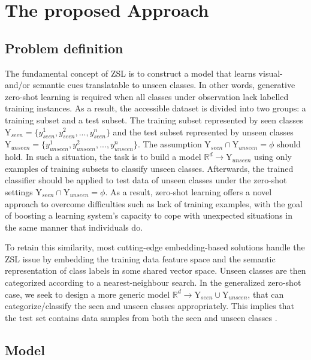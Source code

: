 \documentclass{article}
\begin{document}
\section{The proposed Approach}
\subsection{Problem definition}
The fundamental concept of ZSL is to construct a model that learns visual- and/or semantic cues translatable to unseen classes. In other words, generative zero-shot learning is required when all classes under observation lack labelled  training instances. As a result, the accessible dataset is divided into two groups: a training subset and a test subset. The training subset represented by seen classes $ \mathrm{Y}_{seen}=\{y^{1}_{seen}, y^{2}_{seen}, ..., y^{n}_{seen}\}$ and the test subset represented by unseen classes $ \mathrm{Y}_{unseen} =\{y^{1}_{unseen} , y^{2}_{unseen} , ..., y^{n}_{unseen} \}$. The assumption $ \mathrm{Y}_{seen} \cap  \mathrm{Y}_{unseen} = \phi$  should hold. In such a situation, the task is to build a model $\mathbb{R}^{d}  \rightarrow   \mathrm{Y}_{unseen}$ using only examples of training subsets to classify unseen classes. Afterwards, the trained classifier should be applied to test data of unseen classes under the zero-shot settings $\mathrm{Y}_{seen} \cap  \mathrm{Y}_{unseen} = \phi$. As a result, zero-shot learning offers a novel approach to overcome difficulties such as lack of training examples, with the goal of boosting a learning system's capacity to cope with unexpected situations in the same manner that individuals do.

To retain this similarity, most cutting-edge embedding-based solutions handle the ZSL issue by embedding the training data feature space and the semantic representation of class labels in some shared vector space. Unseen classes are then categorized according to a nearest-neighbour search. In the generalized zero-shot case, we seek to design a more generic model $ \mathbb{R}^{d}  \rightarrow  \mathrm{Y}_{seen} \cup \mathrm{Y}_{unseen} $, that can categorize/classify the seen and unseen classes appropriately. This implies that the test set contains data samples from both the seen and unseen classes \cite{b57}.


\subsection{Model}
\end{document}
